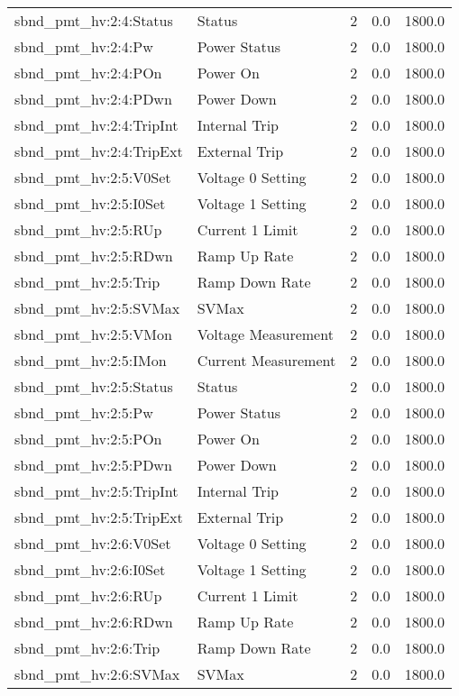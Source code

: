 \begin{center}
\begin{longtable}{l | l l l l }
sbnd\_pmt\_hv:2:4:Status & Status & 2 & 0.0 & 1800.0\\ 
sbnd\_pmt\_hv:2:4:Pw & Power Status & 2 & 0.0 & 1800.0\\ 
sbnd\_pmt\_hv:2:4:POn & Power On & 2 & 0.0 & 1800.0\\ 
sbnd\_pmt\_hv:2:4:PDwn & Power Down & 2 & 0.0 & 1800.0\\ 
sbnd\_pmt\_hv:2:4:TripInt & Internal Trip & 2 & 0.0 & 1800.0\\ 
sbnd\_pmt\_hv:2:4:TripExt & External Trip & 2 & 0.0 & 1800.0\\ 
sbnd\_pmt\_hv:2:5:V0Set & Voltage 0 Setting & 2 & 0.0 & 1800.0\\ 
sbnd\_pmt\_hv:2:5:I0Set & Voltage 1 Setting & 2 & 0.0 & 1800.0\\ 
sbnd\_pmt\_hv:2:5:RUp & Current 1 Limit & 2 & 0.0 & 1800.0\\ 
sbnd\_pmt\_hv:2:5:RDwn & Ramp Up Rate & 2 & 0.0 & 1800.0\\ 
sbnd\_pmt\_hv:2:5:Trip & Ramp Down Rate & 2 & 0.0 & 1800.0\\ 
sbnd\_pmt\_hv:2:5:SVMax & SVMax & 2 & 0.0 & 1800.0\\ 
sbnd\_pmt\_hv:2:5:VMon & Voltage Measurement & 2 & 0.0 & 1800.0\\ 
sbnd\_pmt\_hv:2:5:IMon & Current Measurement & 2 & 0.0 & 1800.0\\ 
sbnd\_pmt\_hv:2:5:Status & Status & 2 & 0.0 & 1800.0\\ 
sbnd\_pmt\_hv:2:5:Pw & Power Status & 2 & 0.0 & 1800.0\\ 
sbnd\_pmt\_hv:2:5:POn & Power On & 2 & 0.0 & 1800.0\\ 
sbnd\_pmt\_hv:2:5:PDwn & Power Down & 2 & 0.0 & 1800.0\\ 
sbnd\_pmt\_hv:2:5:TripInt & Internal Trip & 2 & 0.0 & 1800.0\\ 
sbnd\_pmt\_hv:2:5:TripExt & External Trip & 2 & 0.0 & 1800.0\\ 
sbnd\_pmt\_hv:2:6:V0Set & Voltage 0 Setting & 2 & 0.0 & 1800.0\\ 
sbnd\_pmt\_hv:2:6:I0Set & Voltage 1 Setting & 2 & 0.0 & 1800.0\\ 
sbnd\_pmt\_hv:2:6:RUp & Current 1 Limit & 2 & 0.0 & 1800.0\\ 
sbnd\_pmt\_hv:2:6:RDwn & Ramp Up Rate & 2 & 0.0 & 1800.0\\ 
sbnd\_pmt\_hv:2:6:Trip & Ramp Down Rate & 2 & 0.0 & 1800.0\\ 
sbnd\_pmt\_hv:2:6:SVMax & SVMax & 2 & 0.0 & 1800.0\\ 

\end{longtable}
\end{center}
